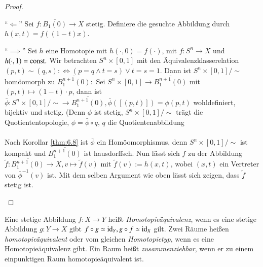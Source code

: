 \documentclass[a4paper,10pt]{scrartcl}
\begin{document}
\begin{proof}
 \begin{seg}{"`$\Longleftarrow$"'}
  Sei $f: \overline{B_1(0)}\to X$ stetig. Definiere die gesuchte Abbildung durch $h(x,t)=f((1-t)x)$.
 \end{seg}
\begin{seg}{"`$\implies$"'}
 Sei $h$ eine Homotopie mit $h(\cdot, 0)=f(\cdot)$, mit $f:S^n \to X$ und $h(\cdot, 1)=\text{const}.$
\fixme[fig42]
Wir betrachten $S^n\times[0,1]$ mit den Äquivalenzklasserelation $(p,t)\sim (q,s) :\iff (p=q \land t=s) \lor t=s=1$. Dann ist $S^n\times[0,1]/\sim$ homöomorph zu $\overline{B_1^{n+1}(0)}:$ Sei $S^n\times[0,1]\to \overline{B_1^{n+1}(0)}$ mit $(p,t)\mapsto (1-t)\cdot p$, dann ist $\bar \phi: S^n \times[0,1]/\sim \to \overline{B_1^{n+1}(0)}, \bar \phi([(p,t)])=\phi(p,t)$ wohldefiniert, bijektiv und stetig. (Denn $\phi$ ist stetig, $S^n\times [0,1]/\sim$ trägt die Quotiententopologie, $\phi=\bar \phi \circ q $, $q$ die Quotientenabbildung\\
\\
Nach Korollar \ref{thm:6.8} ist $\bar \phi$ ein Homöomorphismus, denn $S^n\times [0,1]/\sim$ ist kompakt und $\overline{B_1^{n+1}(0)}$ ist hausdorffsch. Nun lässt sich $f$ zu der Abbildung $\tilde f: \overline{B_1^{n+1}(0)}\to X, v\mapsto \tilde f(v)$ mit $\tilde f(v):= h(x,t)$,
wobei $(x,t)$ ein Vertreter von $\bar \phi^{-1}(v)$ ist. Mit dem selben Argument wie oben lässt sich zeigen, dass $\tilde f$ stetig ist.
\end{seg}
\end{proof}
\begin{df}
 Eine stetige Abbildung $f: X\to Y$ heißt \emph{Homotopieäquivalenz}, wenn es eine stetige Abbildung $g: Y\to X$ gibt $f\circ g \simeq \operatorname{id}_Y, g\circ f \simeq \operatorname{id}_X$ gilt. Zwei
Räume heißen \emph{homotopieäquivalent} oder vom gleichen \emph{Homotopietyp}, wenn es eine Homotopieäquivalenz gibt. Ein Raum heißt \emph{zusammenziehbar}, wenn er zu einem einpunktigen Raum homotopieäquivalent ist.
\end{df}
\end{document}
